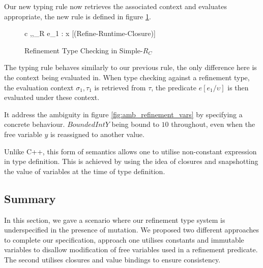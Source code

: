 \documentclass[a4paper,12pt]{report}
\begin{document}
\par
Our new typing rule now retrieves the associated context 
and evaluates appropriate, the new rule is defined in figure \ref{fig:runtime_refine_closure}. 

\begin{figure}[H]
  \begin{center}
    \begin{tabular}{c}      
      {\Gamma,\sigma,\tau \vdash_{R} e_1 : x } [(Refine-Runtime-Closure)]
    \end{tabular}
  \end{center}
  \caption{Refinement Type Checking in Simple-$R_{C}$}
  \label{fig:runtime_refine_closure}
\end{figure}

\par
The typing rule behaves similarly to our previous rule, the only 
difference here is the context being evaluated in. When type checking against a 
refinement type, the evaluation context $\sigma_1, \tau_1$ is retrieved 
from $\tau$, the predicate $e[e_1/\upsilon]$ is then evaluated under these context.

\par
It address the ambiguity in figure \ref{fig:amb_refinement_vars} by specifying 
a concrete behaviour. $BoundedIntY$ being bound to $10$ throughout, even when 
the free variable $y$ is reassigned to another value.
 
\par
Unlike C++, this form of semantics allows one to utilise non-constant expression 
in type definition. This is achieved by using the idea of closures and 
snapshotting the value of variables at the time of type definition. 
 
\subsection{Summary}
In this section, we gave a scenario where our refinement type system is 
underspecified in the presence of mutation. We proposed two different approaches 
to complete our specification, approach one utilises constants and immutable 
variables to disallow modification of free variables used in a refinement 
predicate. The second utilises closures and value bindings to ensure 
consistency. 
\end{document}
